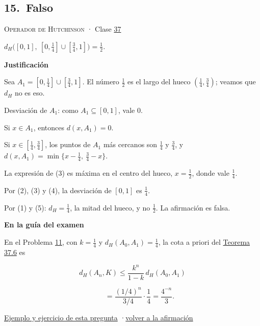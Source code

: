 \documentclass[11pt,a4paper]{article}
\newcommand{\bloque}[1]{\par\smallskip\noindent\textbf{\color{acento}#1}\par}
\begin{document}
\subsection*{\hypertarget{r-15}{}15.\ \textcolor{bad}{Falso}}
{\small \textsc{Operador de Hutchinson} · Clase \href{https://decostruttivismo.github.io/MAT2514-repaso/pdf/MAT2514_apuntes_completos.pdf\#nameddest=section.37}{37}}\par
\emph{$d_H\bigl([0,1],\ [0,\frac14]\cup[\frac34,1]\bigr)=\frac12$.}
\bloque{Justificación}
\begin{pasos}
\item[] Sea $A_1=[0,\frac14]\cup[\frac34,1]$. El número $\frac12$ es el largo del hueco $(\frac14,\frac34)$; veamos que $d_H$ no es eso.
\item[(1)] Desviación de $A_1$: como $A_1\subseteq[0,1]$, vale $0$.
\item[(2)] Si $x\in A_1$, entonces $d(x,A_1)=0$.
\item[(3)] Si $x\in[\frac14,\frac34]$, los puntos de $A_1$ más cercanos son $\frac14$ y $\frac34$, y $d(x,A_1)=\min\{x-\frac14,\ \frac34-x\}$.
\item[(4)] La expresión de (3) es máxima en el centro del hueco, $x=\frac12$, donde vale $\frac14$.
\item[(5)] Por (2), (3) y (4), la desviación de $[0,1]$ es $\frac14$.
\item[] Por (1) y (5): $d_H=\frac14$, la mitad del hueco, y no $\frac12$. La afirmación es falsa.
\end{pasos}
\bloque{En la guía del examen}
\begin{pasos}
\item[] En el Problema \hyperlink{prob-11}{11}, con $k=\frac14$ y $d_H(A_0,A_1)=\frac14$, la cota a priori del \href{https://decostruttivismo.github.io/MAT2514-repaso/pdf/MAT2514_apuntes_completos.pdf\#nameddest=teorema.37.6}{Teorema 37.6} es
\item[] \[d_H(A_n,K)\le\frac{k^n}{1-k}\,d_H(A_0,A_1)\]
\item[] \[\qquad=\frac{(1/4)^n}{3/4}\cdot\frac14=\frac{4^{-n}}3.\]
\end{pasos}
\par{}
\par{\small \hyperlink{e-15}{Ejemplo y ejercicio de esta pregunta} \quad·\quad \hyperlink{q-15}{volver a la afirmación}}
\end{document}
